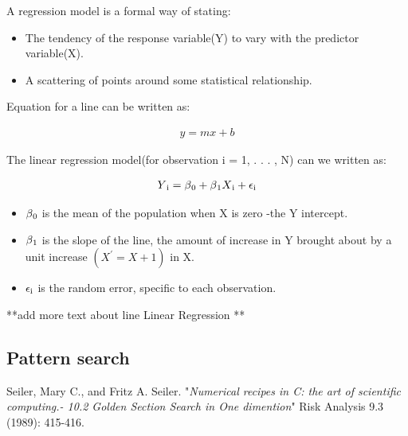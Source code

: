 {A regression model is a formal way of stating:
\begin{itemize}
\item The tendency of the response variable(Y) to vary with the predictor variable(X).
\item A scattering of points around some statistical relationship.
\end {itemize}

Equation for a line can be written as:

\begin{equation}
\begin{aligned}
  y= mx + b 
\label{eq:Line_equ}
\end{aligned}
\end{equation}

The linear regression model(for observation i = 1, . . . , N) can we written as:

\begin{equation}
\begin{aligned}
  Y\textsubscript{i}= \beta\textsubscript{0}+\beta\textsubscript{1}X\textsubscript{i} +\epsilon\textsubscript{i}
\label{eq:Line_equ}
\end{aligned}
\end{equation}

\begin{itemize}
\item $\beta\textsubscript{0}$ is the mean of the population when X is zero -the Y intercept.\\
\item $\beta\textsubscript{1}$ is the slope of the line, the amount of increase in Y brought about by a unit increase $(X^{'}= X + 1)$ in X.\\
\item \textbf{$\epsilon\textsubscript{i}$} is the random error, specific to each observation.
\end {itemize}



**add more text about line Linear Regression **


\subsection{Pattern search}

Seiler, Mary C., and Fritz A. Seiler. "\textit{Numerical recipes in C: the art of scientific computing.- 10.2 Golden Section Search in One dimention}" Risk Analysis 9.3 (1989): 415-416.\\

}
